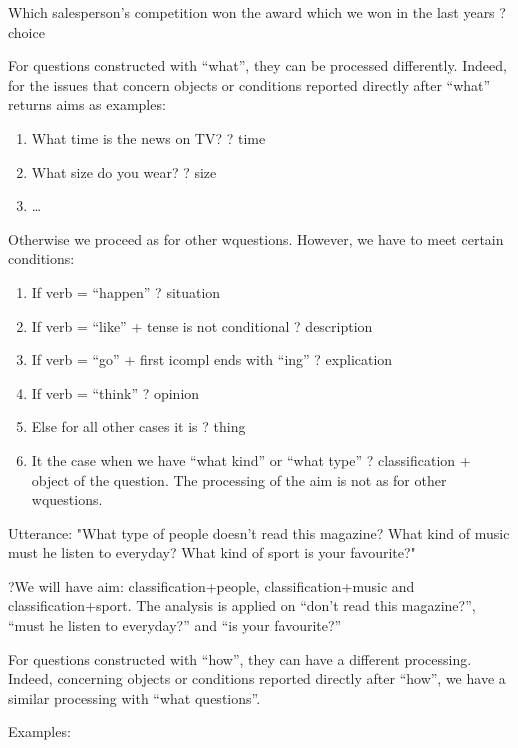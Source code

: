 \documentclass[twoside,a4paper,10pt]{report}
\begin{document}
Which salesperson's competition won the award which we won in the last years ? choice

For questions constructed with “what”, they can be processed differently. Indeed, for the issues that concern objects or conditions reported directly after “what” returns aims as examples:


\begin{enumerate}    \item  What time is the news on TV? ? time
    \item  What size do you wear? ? size
    \item  \ldots{}
\end{enumerate}

Otherwise we proceed as for other w{\textunderscore}questions. However, we have to meet certain conditions:


\begin{enumerate}    \item  If verb = “happen” ? situation
    \item  If verb = “like” + tense is not conditional ? description
    \item  If verb = “go” + first i{\textunderscore}compl ends with “ing” ? explication
    \item  If verb = “think” ? opinion
    \item  Else for all other cases it is ? thing
    \item  It the case when we have “what kind” or “what type” ? classification + object of the question. The processing of the aim is not as for other w{\textunderscore}questions.
\end{enumerate}

Utterance: "What type of people doesn’t read this magazine? What kind of music must he listen to everyday? What kind of sport is your favourite?"



\small
\begin{verbatimtab}
  ?We will have aim: classification+people, classification+music and classification+sport. The
analysis is applied on “don't read this magazine?”, “must he listen to everyday?” and “is
your favourite?”
\end{verbatimtab}
\normalsize
For questions constructed with “how”, they can have a different processing. Indeed, concerning objects or conditions reported directly after “how”, we have a similar processing with “what questions”. 

Examples:
\end{document}
